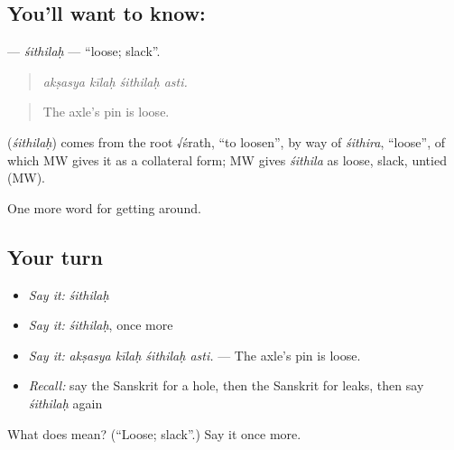 \subsection*{You'll want to know: }
\textbf{} — \emph{śithilaḥ} — \textquotedblleft{}loose; slack\textquotedblright{}.

\begin{quote}
   
\end{quote}

\begin{quote}
\emph{akṣasya kīlaḥ śithilaḥ asti.}
\end{quote}

\begin{quote}
The axle's pin is loose.
\end{quote}

\begin{cousinweb}
\textbf{} (\emph{śithilaḥ}) comes from the root √śrath, \textquotedblleft{}to loosen\textquotedblright{}, by way of \emph{śithira}, \textquotedblleft{}loose\textquotedblright{}, of which MW gives it as a collateral form; MW gives \emph{śithila} as loose, slack, untied (MW).
\end{cousinweb}

\begin{grammarlens}[title={What you've built}]
One more word for getting around.
\end{grammarlens}

\subsection*{Your turn}
\begin{itemize}
\raggedright
  \item \emph{Say it:} \emph{śithilaḥ}
  \item \emph{Say it:} \emph{śithilaḥ}, once more
  \item \emph{Say it:} \emph{akṣasya kīlaḥ śithilaḥ asti.} — The axle's pin is loose.
  \item \emph{Recall:} say the Sanskrit for a hole, then the Sanskrit for leaks, then say \emph{śithilaḥ} again
\end{itemize}

\begin{tcolorbox}[breakable,colback=teal!4,colframe=teal!35!black,title={Before you move on}]
What does  mean? (\textquotedblleft{}Loose; slack\textquotedblright{}.) Say it once more.
\end{tcolorbox}
